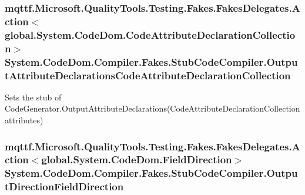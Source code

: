\hypertarget{class_system_1_1_code_dom_1_1_compiler_1_1_fakes_1_1_stub_code_compiler_a7d92491628971b4c47682aea0ab250a9}{
\subsubsection[{Output\-Attribute\-Declarations\-Code\-Attribute\-Declaration\-Collection}]{\setlength{\rightskip}{0pt plus 5cm}mqttf.\-Microsoft.\-Quality\-Tools.\-Testing.\-Fakes.\-Fakes\-Delegates.\-Action$<$global.\-System.\-Code\-Dom.\-Code\-Attribute\-Declaration\-Collection$>$ System.\-Code\-Dom.\-Compiler.\-Fakes.\-Stub\-Code\-Compiler.\-Output\-Attribute\-Declarations\-Code\-Attribute\-Declaration\-Collection}}\label{class_system_1_1_code_dom_1_1_compiler_1_1_fakes_1_1_stub_code_compiler_a7d92491628971b4c47682aea0ab250a9}


Sets the stub of Code\-Generator.\-Output\-Attribute\-Declarations(\-Code\-Attribute\-Declaration\-Collection attributes)

\hypertarget{class_system_1_1_code_dom_1_1_compiler_1_1_fakes_1_1_stub_code_compiler_a58a9699a16621f2af4096feaa900bac9}{
\subsubsection[{Output\-Direction\-Field\-Direction}]{\setlength{\rightskip}{0pt plus 5cm}mqttf.\-Microsoft.\-Quality\-Tools.\-Testing.\-Fakes.\-Fakes\-Delegates.\-Action$<$global.\-System.\-Code\-Dom.\-Field\-Direction$>$ System.\-Code\-Dom.\-Compiler.\-Fakes.\-Stub\-Code\-Compiler.\-Output\-Direction\-Field\-Direction}}\label{class_system_1_1_code_dom_1_1_compiler_1_1_fakes_1_1_stub_code_compiler_a58a9699a16621f2af4096feaa900bac9}


